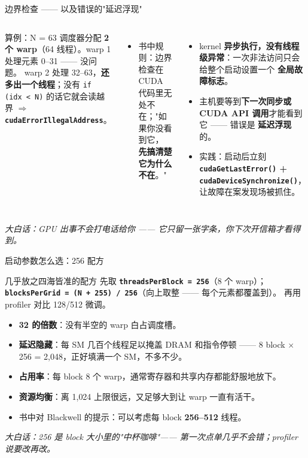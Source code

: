 \documentclass[aspectratio=169]{beamer}
\newcommand{\kw}[1]{\textbf{\textcolor{kwblue}{#1}}}
\newcommand{\pe}[1]{{\footnotesize\itshape 大白话：#1}}
\begin{document}
\begin{frame}{边界检查 —— 以及错误的"延迟浮现"}
  \begin{columns}[t]
    \begin{block}{算例：N = 63}
      \small 调度器分配 \kw{2 个 warp}（64 线程）。warp 1 处理元素 0--31 —— 没问题。
      warp 2 处理 32--63，\kw{还多出一个线程}；没有 \texttt{if (idx < N)} 的话它就会读越界
      $\Rightarrow$ \kw{\texttt{cudaErrorIllegalAddress}}。
    \end{block}
    \begin{itemize}\small
      \item 书中规则：边界检查在 CUDA 代码里无处不在；"如果你没看到它，
            \kw{先搞清楚它为什么不在}。"
    \end{itemize}
    \begin{itemize}
      \item kernel \kw{异步执行，没有线程级异常}：一次非法访问只会给整个启动设置一个
            \kw{全局故障标志}。
      \item 主机要等到\kw{下一次同步或 CUDA API 调用}才能看到它 —— 错误是
            \kw{延迟浮现}的。
      \item 实践：启动后立刻
            \kw{\texttt{cudaGetLastError()} + \texttt{cudaDeviceSynchronize()}}，
            让故障在案发现场被抓住。
    \end{itemize}
  \end{columns}
  \medskip
  \pe{GPU 出事不会打电话给你 —— 它只留一张字条，你下次开信箱才看得到。}
\end{frame}

\begin{frame}{启动参数怎么选：256 配方}
  \begin{block}{几乎放之四海皆准的配方}
    先取 \kw{\texttt{threadsPerBlock = 256}}（8 个 warp）；
    \kw{\texttt{blocksPerGrid = (N + 255) / 256}}（向上取整 —— 每个元素都覆盖到）。
    再用 profiler 对比 128/512 微调。
  \end{block}
  \begin{itemize}
    \item \kw{32 的倍数}：没有半空的 warp 白占调度槽。
    \item \kw{延迟隐藏}：每 SM 几百个线程足以掩盖 DRAM 和指令停顿 ——
          8 block $\times$ 256 = 2{,}048，正好填满一个 SM，不多不少。
    \item \kw{占用率}：每 block 8 个 warp，通常寄存器和共享内存都能舒服地放下。
    \item \kw{资源均衡}：离 1{,}024 上限很远，又足够大到让 warp 一直有活干。
    \item 书中对 Blackwell 的提示：可以考虑每 block \kw{256--512} 线程。
  \end{itemize}
  \medskip
  \pe{256 是 block 大小里的"中杯咖啡"—— 第一次点单几乎不会错；profiler 说要改再改。}
\end{frame}
\end{document}
